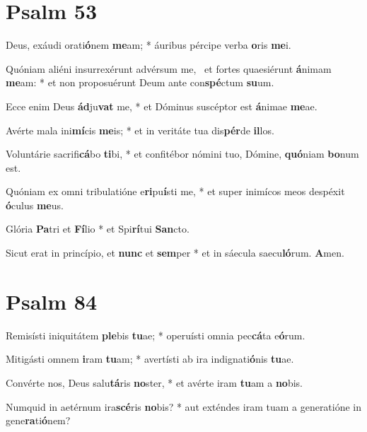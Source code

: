 \documentclass[a5paper, 12pt]{article}
\begin{document}
\section{Psalm 53}



Deus, exáudi orati\textbf{ó}nem \textbf{me}am; * áuribus pércipe verba \textbf{o}ris \textbf{me}i.

Quóniam aliéni insurrexérunt advérsum me, \dag\ et fortes quaesiérunt \textbf{á}nimam \textbf{me}am: * et non proposuérunt Deum ante con\textbf{spé}ctum \textbf{su}um.

Ecce enim Deus \textbf{ád}ju\textbf{vat} me, * et Dóminus suscéptor est \textbf{á}nimae \textbf{me}ae.

Avérte mala ini\textbf{mí}cis \textbf{me}is; * et in veritáte tua dis\textbf{pér}de \textbf{il}los.

Voluntárie sacrifi\textbf{cá}bo \textbf{ti}bi, * et confitébor nómini tuo, Dómine, \textbf{quó}niam \textbf{bo}num est.

Quóniam ex omni tribulatióne e\textbf{ri}pu\textbf{í}sti me, * et super inimícos meos despéxit \textbf{ó}culus \textbf{me}us.

Glória \textbf{Pa}tri et \textbf{Fí}lio * et Spi\textbf{rí}tui \textbf{San}cto.

Sicut erat in princípio, et \textbf{nunc} et \textbf{sem}per * et in sáecula saecu\textbf{ló}rum. \textbf{A}men.


\section{Psalm 84}



Remisísti iniquitátem \textbf{ple}bis \textbf{tu}ae; * operuísti omnia pec\textbf{cá}ta e\textbf{ó}rum.

Mitigásti omnem \textbf{i}ram \textbf{tu}am; * avertísti ab ira indignati\textbf{ó}nis \textbf{tu}ae.

Convérte nos, Deus salu\textbf{tá}ris \textbf{no}ster, * et avérte iram \textbf{tu}am a \textbf{no}bis. 

Numquid in aetérnum ira\textbf{scé}ris \textbf{no}bis? * aut exténdes iram tuam a generatióne in gene\textbf{ra}ti\textbf{ó}nem? 
\end{document}
